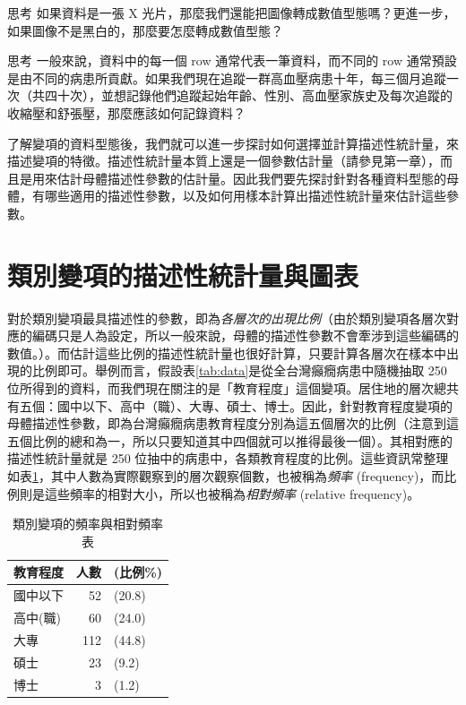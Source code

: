     \begin{custom}{思考}
        如果資料是一張 X 光片，那麼我們還能把圖像轉成數值型態嗎？更進一步，如果圖像不是黑白的，那麼要怎麼轉成數值型態？
    \end{custom}

    \begin{custom}{思考}
        一般來說，資料中的每一個 row 通常代表一筆資料，而不同的 row 通常預設是由不同的病患所貢獻。如果我們現在追蹤一群高血壓病患十年，每三個月追蹤一次（共四十次），並想記錄他們追蹤起始年齡、性別、高血壓家族史及每次追蹤的收縮壓和舒張壓，那麼應該如何記錄資料？
    \end{custom}

    了解變項的資料型態後，我們就可以進一步探討如何選擇並計算描述性統計量，來描述變項的特徵。描述性統計量本質上還是一個參數估計量（請參見第一章），而且是用來估計母體描述性參數的估計量。因此我們要先探討針對各種資料型態的母體，有哪些適用的描述性參數，以及如何用樣本計算出描述性統計量來估計這些參數。
    
\section{類別變項的描述性統計量與圖表}

    對於類別變項最具描述性的參數，即為\textit{各層次的出現比例}（由於類別變項各層次對應的編碼只是人為設定，所以一般來說，母體的描述性參數不會牽涉到這些編碼的數值。）。而估計這些比例的描述性統計量也很好計算，只要計算各層次在樣本中出現的比例即可。舉例而言，假設表\ref{tab:data}是從全台灣癲癇病患中隨機抽取 250 位所得到的資料，而我們現在關注的是「教育程度」這個變項。居住地的層次總共有五個：國中以下、高中（職）、大專、碩士、博士。因此，針對教育程度變項的母體描述性參數，即為台灣癲癇病患教育程度分別為這五個層次的比例（注意到這五個比例的總和為一，所以只要知道其中四個就可以推得最後一個）。其相對應的描述性統計量就是 250 位抽中的病患中，各類教育程度的比例。這些資訊常整理如表\ref{tab:categorical_desc}，其中人數為實際觀察到的層次觀察個數，也被稱為\textit{頻率} (frequency)，而比例則是這些頻率的相對大小，所以也被稱為\textit{相對頻率} (relative frequency)。

    \begin{table}[htbp]
        \begin{center}
            \begin{tabular}{lrl}
                \toprule
                \textbf{教育程度} & \textbf{人數} & \textbf{(比例\%)}\\
                \hline
                國中以下 & 52 & (20.8)\\
                高中(職) & 60 & (24.0)\\
                大專 & 112 & (44.8)\\
                碩士 & 23 & (9.2)\\
                博士 & 3 & (1.2)\\
                \bottomrule
            \end{tabular}
            \caption{類別變項的頻率與相對頻率表\label{tab:categorical_desc}}
        \end{center}
    \end{table}

